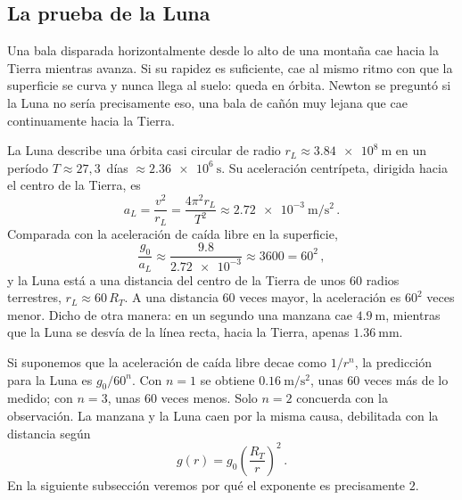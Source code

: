 
\subsection{La prueba de la Luna}
\label{subsec:prueba_luna}

Una bala disparada horizontalmente desde lo alto de una montaña cae hacia la
Tierra mientras avanza. Si su rapidez es suficiente, cae al mismo ritmo con
que la superficie se curva y nunca llega al suelo: queda en órbita. Newton se
preguntó si la Luna no sería precisamente eso, una bala de cañón muy lejana
que cae continuamente hacia la Tierra.

La Luna describe una órbita casi circular de radio
$r_L \approx \SI{3.84e8}{\meter}$ en un período $T \approx 27{,}3$~días
$\approx \SI{2.36e6}{\second}$. Su aceleración centrípeta, dirigida hacia el
centro de la Tierra, es
\begin{equation}
  a_L = \frac{v^{2}}{r_L} = \frac{4\pi^{2} r_L}{T^{2}}
  \approx \SI{2.72e-3}{\meter\per\second\squared} \,.
  \label{eq:aceleracion_luna}
\end{equation}
Comparada con la aceleración de caída libre en la superficie,
\begin{equation}
  \frac{g_0}{a_L} \approx \frac{\num{9.8}}{\num{2.72e-3}}
  \approx 3600 = 60^{2} \,,
  \label{eq:cociente_luna}
\end{equation}
y la Luna está a una distancia del centro de la Tierra de unos $60$ radios
terrestres, $r_L \approx 60\,R_T$. A una distancia $60$ veces mayor, la
aceleración es $60^{2}$ veces menor. Dicho de otra manera: en un segundo una
manzana cae $\SI{4.9}{\meter}$, mientras que la Luna se desvía de la línea
recta, hacia la Tierra, apenas $\SI{1.36}{\milli\meter}$.

Si suponemos que la aceleración de caída libre decae como $1/r^{n}$, la
predicción para la Luna es $g_0/60^{n}$. Con $n = 1$ se obtiene
$\SI{0.16}{\meter\per\second\squared}$, unas $60$ veces más de lo medido;
con $n = 3$, unas $60$ veces menos. Solo $n = 2$ concuerda con la
observación. La manzana y la Luna caen por la misma causa, debilitada con la
distancia según
\begin{equation}
  g(r) = g_0 \left( \frac{R_T}{r} \right)^{2} \,.
  \label{eq:g_inverso_cuadrado}
\end{equation}
En la siguiente subsección veremos por qué el exponente es precisamente
$2$.

